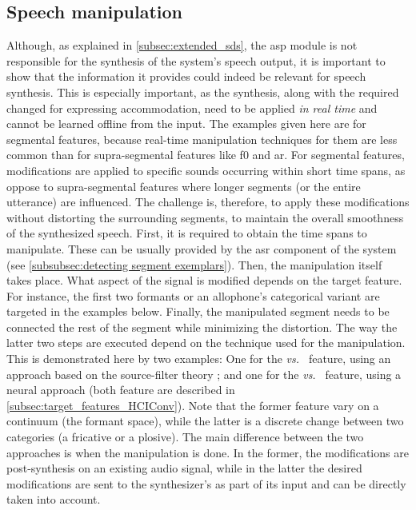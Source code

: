 \subsection{Speech manipulation}
\label{subsec:speech_manipulation}

Although, as explained in \cref{subsec:extended_sds}, the \ac{asp} module is not responsible for the synthesis of the system's speech output, it is important to show that the information it provides could indeed be relevant for speech synthesis.
This is especially important, as the synthesis, along with the required changed for expressing accommodation, need to be applied \emph{in real time} and cannot be learned offline from the input.
The examples given here are for segmental features, because real-time manipulation techniques for  them are less common than for supra-segmental features like \ac{f0} and \ac{ar}.
For segmental features, modifications are applied to specific sounds occurring within short time spans, as oppose to supra-segmental features where longer segments (or the entire utterance) are influenced.
The challenge is, therefore, to apply these modifications without distorting the surrounding segments, to maintain the overall smoothness of the synthesized speech.
First, it is required to obtain the time spans to manipulate.
These can be usually provided by the \ac{asr} component of the system (see \cref{subsubsec:detecting segment exemplars}).
Then, the manipulation itself takes place.
What aspect of the signal is modified depends on the target feature.
For instance, the first two formants or an allophone's categorical variant are targeted in the examples below.
Finally, the manipulated segment needs to be connected the rest of the segment while minimizing the distortion.
The way the latter two steps are executed depend on the technique used for the manipulation.
This is demonstrated here by two examples:
One for the \emph{\textipa{[e]} vs.\ \textipa{[E]}} feature, using an approach based on the source-filter theory \citep{Fant1970acoustic}; and one for the \emph{\textipa{[\c{c}]} vs.\ \textipa{[k]}} feature, using a neural approach (both feature are described in \cref{subsec:target_features_HCIConv}).
Note that the former feature vary on a continuum (the formant space), while the latter is a discrete change between two categories (a fricative or a plosive).
The main difference between the two approaches is when the manipulation is done.
In the former, the modifications are post-synthesis on an existing audio signal, while in the latter the desired modifications are sent to the synthesizer's as part of its input and can be directly taken into account.
